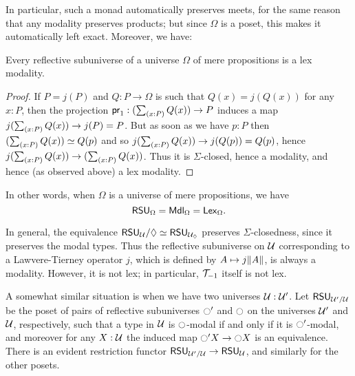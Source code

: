 In particular, such a monad automatically preserves meets, for the same reason that any modality preserves products; but since $\Omega$ is a poset, this makes it automatically left exact.
Moreover, we have:

\begin{lem}\label{thm:rsu-prop}
  Every reflective subuniverse of a universe $\Omega$ of mere propositions is a lex modality.
\end{lem}
\begin{proof}
  If $P=j(P)$ and $Q:P\to \Omega$ is such that $Q(x)=j(Q(x))$ for any $x:P$, then the projection $\proj1:(\sm{x:P} Q(x))\to P$ induces a map $j(\sm{x:P} Q(x))\to j(P) = P$.
  But as soon as we have $p:P$ then $(\sm{x:P} Q(x))\simeq Q(p)$ and so $j(\sm{x:P} Q(x)) \to j(Q(p)) = Q(p)$, hence $j(\sm{x:P} Q(x))\to (\sm{x:P} Q(x))$.
  Thus it is $\Sigma$-closed, hence a modality, and hence (as observed above) a lex modality.
\end{proof}

In other words, when $\Omega$ is a universe of mere propositions, we have
\[ \rsu[\Omega] = \mdl[\Omega] = \lex[\Omega]. \]

In general, the equivalence $\rsu/\lozenge \eqvsym \rsu[\UU_{\lozenge}]$ preserves $\Sigma$-closedness, since it preserves the modal types.
Thus the reflective subuniverse on $\UU$ corresponding to a Lawvere-Tierney operator $j$, which is defined by $A\mapsto j\brck{A}$, is always a modality.
However, it is not lex; in particular, $\truncmod{-1}$ itself is not lex.

A somewhat similar situation is when we have two universes $\UU:\UU'$.
Let $\rsu[\UU'/\UU]$ be the poset of pairs of reflective subuniverses $\modal'$ and $\modal$ on the universes $\UU'$ and $\UU$, respectively, such that a type in $\UU$ is $\modal$-modal if and only if it is $\modal'$-modal, and moreover for any $X:\UU$ the induced map $\modal' X \to \modal X$ is an equivalence.
There is an evident restriction functor $\rsu[\UU'/\UU] \to \rsu[\UU]$, and similarly for the other posets.

